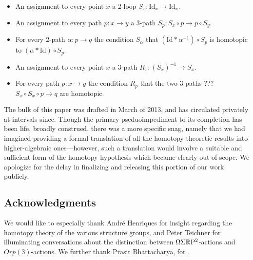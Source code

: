 \documentclass{amsart}
\begin{document}
\begin{itemize}
\item An assignment to every point $x$ a $2$-loop $S_x: \mathrm{Id}_x \rightarrow \mathrm{Id}_x$.
\item An assignment to every path $p:x \rightarrow y$ a $3$-path $S_p: S_x \circ p \rightarrow p \circ S_y$.
\item For every $2$-path $\alpha: p \rightarrow q$ the condition $S_\alpha$ that $(\mathrm{Id} \ast \alpha^{-1}) \circ S_p$ is homotopic to $(\alpha \ast \mathrm{Id}) \circ S_p$.
\end{itemize}

\begin{itemize}
\item An assignment to every point $x$ a $3$-path $R_x: (S_x)^{-1}  \rightarrow S_x$.
\item For every path $p: x \rightarrow y$ the condition $R_p$ that the two $3$-paths ??? $S_x \circ S_x \circ p \rightarrow q$ are homotopic.
\end{itemize}

\begin{remark}[Sorry]
The bulk of this paper was drafted in March of 2013, and has circulated privately at intervals since. Though the primary pseduoimpediment to its completion has been life, broadly construed, there was a more specific snag, namely that we had imagined providing a formal translation of all the homotopy-theoretic results into higher-algebraic ones---however, such a translation would involve a suitable and sufficient form of the homotopy hypothesis which became clearly out of scope. We apologize for the delay in finalizing and releasing this portion of our work publicly.
\end{remark}


\subsection*{Acknowledgments}

We would like to especially thank Andr\'e Henriques for insight regarding the homotopy theory of the various structure groups, and Peter Teichner for illuminating conversations about the distinction between $\Omega \Sigma \mathbb R \mathrm{P}^2$-actions and $Orp(3)$-actions. We further thank Prasit Bhattacharya,  for .

\end{document}

